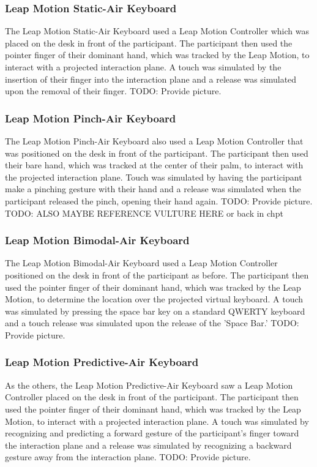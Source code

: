 \subsubsection{Leap Motion Static-Air Keyboard}
The Leap Motion Static-Air Keyboard used a Leap Motion Controller which was placed on the desk in front of the participant. The participant then used the pointer finger of their dominant hand, which was tracked by the Leap Motion, to interact with a projected interaction plane. A touch was simulated by the insertion of their finger into the interaction plane and a release was simulated upon the removal of their finger. TODO: Provide picture.

\subsubsection{Leap Motion Pinch-Air Keyboard}
The Leap Motion Pinch-Air Keyboard also used a Leap Motion Controller that was positioned on the desk in front of the participant. The participant then used their bare hand, which was tracked at the center of their palm, to interact with the projected interaction plane. Touch was simulated by having the participant make a pinching gesture with their hand and a release was simulated when the participant released the pinch, opening their hand again. TODO: Provide picture. TODO: ALSO MAYBE REFERENCE VULTURE HERE or back in chpt

\subsubsection{Leap Motion Bimodal-Air Keyboard}
The Leap Motion Bimodal-Air Keyboard used a Leap Motion Controller positioned on the desk in front of the participant as before. The participant then used the pointer finger of their dominant hand, which was tracked by the Leap Motion, to determine the location over the projected virtual keyboard. A touch was simulated by pressing the space bar key on a standard QWERTY keyboard and a touch release was simulated upon the release of the 'Space Bar.' TODO: Provide picture.

\subsubsection{Leap Motion Predictive-Air Keyboard}
As the others, the Leap Motion Predictive-Air Keyboard saw a Leap Motion Controller placed on the desk in front of the participant. The participant then used the pointer finger of their dominant hand, which was tracked by the Leap Motion, to interact with a projected interaction plane. A touch was simulated by recognizing and predicting a forward gesture of the participant's finger toward the interaction plane and a release was simulated by recognizing a backward gesture away from the interaction plane. TODO: Provide picture.

